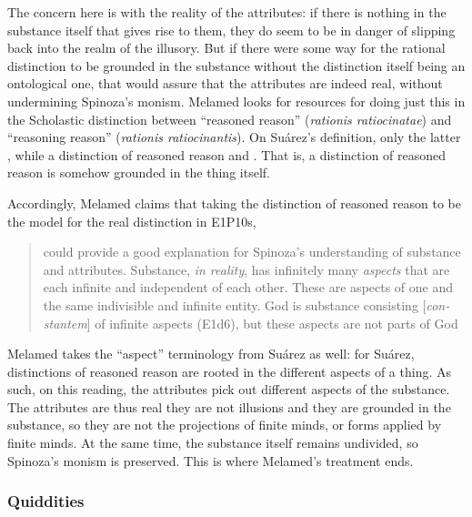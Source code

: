 \documentclass[11pt]{article}
\newcommand{\dash}{\unskip{---}}
\newcommand\foreign[2]{\foreignlanguage{#1}{\emph{#2}}}
\begin{document}
	The concern here is with the reality of the attributes: if there is nothing in the substance itself that gives rise to them, they do seem to be in danger of slipping back into the realm of the illusory. But if there were some way for the rational distinction to be grounded in the substance without the distinction itself being an ontological one, that would assure that the attributes are indeed real, without undermining Spinoza’s monism. Melamed looks for resources for doing just this in the Scholastic distinction between \enquote{reasoned reason} (\foreign{latin}{rationis ratiocinatae}) and \enquote{reasoning reason} (\foreign{latin}{rationis ratiocinantis}). On Suárez’s definition, only the latter , while a distinction of reasoned reason  and . That is, a distinction of reasoned reason is somehow grounded in the thing itself.
	
	
	Accordingly, Melamed claims that taking the distinction of reasoned reason to be the model for the real distinction in E1P10s, \blockcquote[102]{Melamed2017}[.]{could provide a good explanation for Spinoza’s understanding of substance and attributes. Substance, \emph{in reality}, has infinitely many \emph{aspects} that are each infinite and independent of each other. These are aspects of one and the same indivisible and infinite entity. God is substance consisting [\foreign{latin}{constantem}] of infinite aspects (E1d6), but these aspects are not parts of God} Melamed takes the \enquote{aspect} terminology from Suárez as well: for Suárez, distinctions of reasoned reason are rooted in the different aspects of a thing. As such, on this reading, the attributes pick out different aspects of the substance. The attributes are thus real \dash they are not illusions \dash and they are grounded in the substance, so they are not the projections of finite minds, or forms applied by finite minds. At the same time, the substance itself remains undivided, so Spinoza’s monism is preserved. This is where Melamed’s treatment ends.

	
	\subsubsection{Quiddities} \label{subsubsec:Quiddities}
	
\end{document}
